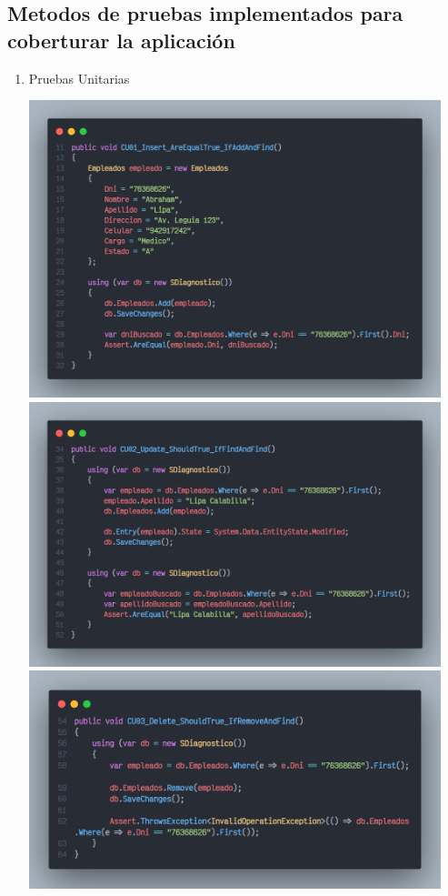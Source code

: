 \documentclass[preprint,12pt]{elsarticle}
\begin{document}
\subsection{\textbf{  Metodos de pruebas implementados para coberturar la aplicación }}
\renewcommand{\labelenumi}{{\theenumi}}
\begin{enumerate}

\item  Pruebas Unitarias

\begin{center}
	\includegraphics[width=12cm]{./imagen/code_1.png} 
	\includegraphics[width=12cm]{./imagen/code_2.png} 
	\includegraphics[width=12cm]{./imagen/code_3.png} 
	\end{center}


\end{enumerate}
\end{document}
